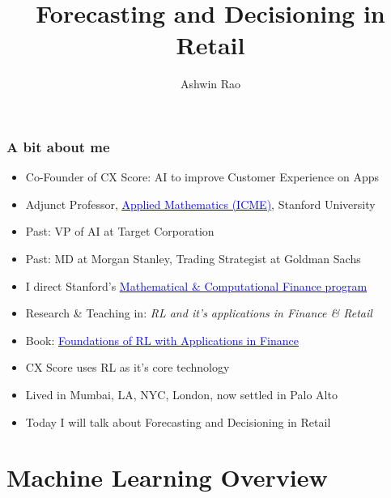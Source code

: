\documentclass[handout]{beamer}
\title[ML for Retail]{Forecasting and Decisioning in Retail} %
\author{Ashwin Rao} %
\institute[Stanford] %
{Stanford University
}
\date{} %
\begin{document}
\begin{frame}
\titlepage %
\end{frame}



\begin{frame}
\frametitle{A bit about me}
\pause
\begin{itemize}[<+->]
\item Co-Founder of CX Score: AI to improve Customer Experience on Apps
\item Adjunct Professor, \href{https://icme.stanford.edu/}{\underline{\textcolor{blue}{Applied Mathematics (ICME)}}}, Stanford University
\item Past: VP of AI at Target Corporation
\item Past: MD at Morgan Stanley, Trading Strategist at Goldman Sachs
\item I direct Stanford's \href{https://mcf.stanford.edu/}{\underline{\textcolor{blue}{Mathematical \& Computational Finance program}}}
\item Research \& Teaching in: {\em RL and it's applications in Finance \& Retail}
\item Book:  \href{https://www.amazon.com/Foundations-Reinforcement-Learning-Applications-Finance/dp/1032124121}{\underline{\textcolor{blue}{Foundations of RL with Applications in Finance}}}
\item CX Score uses RL as it's core technology
\item Lived in Mumbai, LA, NYC, London, now settled in Palo Alto
\item Today I will talk about Forecasting and Decisioning in Retail
\end{itemize}
\end{frame}

\section{Machine Learning Overview}
\end{document}

